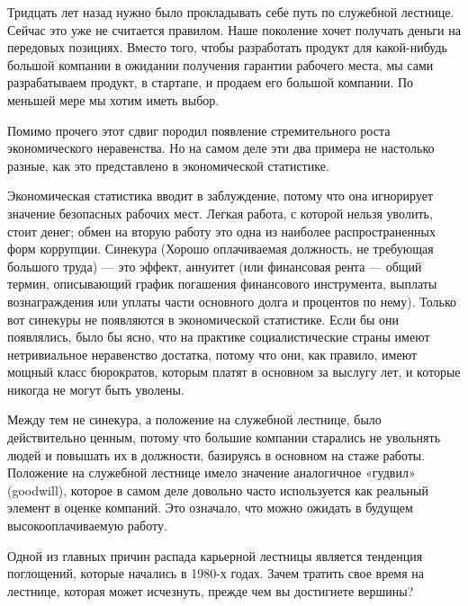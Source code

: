 \documentclass[ebook,12pt,oneside,openany]{memoir}
\begin{document}
\maketitle

Тридцать лет назад нужно было прокладывать себе путь по служебной
лестнице. Сейчас это уже не считается правилом. Наше поколение хочет
получать деньги на передовых позициях. Вместо того, чтобы разработать
продукт для какой-нибудь большой компании в ожидании получения
гарантии рабочего места, мы сами разрабатываем продукт, в стартапе, и
продаем его большой компании. По меньшей мере мы хотим иметь выбор. \newline

Помимо прочего этот сдвиг породил появление стремительного роста
экономического неравенства. Но на самом деле эти два примера не
настолько разные, как это представлено в экономической статистике. \newline

Экономическая статистика вводит в заблуждение, потому что она
игнорирует значение безопасных рабочих мест. Легкая работа, с которой
нельзя уволить, стоит денег; обмен на вторую работу это одна из
наиболее распространенных форм коррупции. Синекура (Хорошо
оплачиваемая должность, не требующая большого труда) — это эффект,
аннуитет (или финансовая рента — общий термин, описывающий график
погашения финансового инструмента, выплаты вознаграждения или уплаты
части основного долга и процентов по нему). Только вот синекуры не
появляются в экономической статистике. Если бы они появлялись, было бы
ясно, что на практике социалистические страны имеют нетривиальное
неравенство достатка, потому что они, как правило, имеют мощный класс
бюрократов, которым платят в основном за выслугу лет, и которые
никогда не могут быть уволены. \newline

Между тем не синекура, а положение на служебной лестнице, было
действительно ценным, потому что большие компании старались не
увольнять людей и повышать их в должности, базируясь в основном на
стаже работы. Положение на служебной лестнице имело значение
аналогичное «гудвил» (goodwill), которое в самом деле довольно часто
используется как реальный элемент в оценке компаний. Это означало, что
можно ожидать в будущем высокооплачиваемую работу. \newline

Одной из главных причин распада карьерной лестницы является тенденция
поглощений, которые начались в 1980-х годах. Зачем тратить свое время
на лестнице, которая может исчезнуть, прежде чем вы достигнете
вершины? \newline
\end{document}
